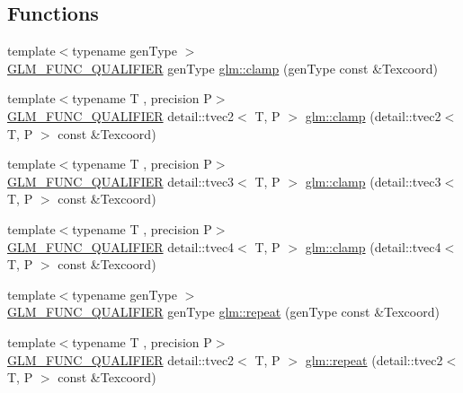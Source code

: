 \subsection*{Functions}
\begin{DoxyCompactItemize}
\item 
{\footnotesize template$<$typename gen\+Type $>$ }\\\hyperlink{setup_8hpp_a33fdea6f91c5f834105f7415e2a64407}{G\+L\+M\+\_\+\+F\+U\+N\+C\+\_\+\+Q\+U\+A\+L\+I\+F\+I\+ER} gen\+Type \hyperlink{group__gtx__wrap_ga6c0cc6bd1d67ea1008d2592e998bad33}{glm\+::clamp} (gen\+Type const \&Texcoord)
\item 
{\footnotesize template$<$typename T , precision P$>$ }\\\hyperlink{setup_8hpp_a33fdea6f91c5f834105f7415e2a64407}{G\+L\+M\+\_\+\+F\+U\+N\+C\+\_\+\+Q\+U\+A\+L\+I\+F\+I\+ER} detail\+::tvec2$<$ T, P $>$ \hyperlink{namespaceglm_ac07453cc5dd0ddf29280decfd676e7a1}{glm\+::clamp} (detail\+::tvec2$<$ T, P $>$ const \&Texcoord)
\item 
{\footnotesize template$<$typename T , precision P$>$ }\\\hyperlink{setup_8hpp_a33fdea6f91c5f834105f7415e2a64407}{G\+L\+M\+\_\+\+F\+U\+N\+C\+\_\+\+Q\+U\+A\+L\+I\+F\+I\+ER} detail\+::tvec3$<$ T, P $>$ \hyperlink{namespaceglm_a378e165eb674a1767e7532381503c45a}{glm\+::clamp} (detail\+::tvec3$<$ T, P $>$ const \&Texcoord)
\item 
{\footnotesize template$<$typename T , precision P$>$ }\\\hyperlink{setup_8hpp_a33fdea6f91c5f834105f7415e2a64407}{G\+L\+M\+\_\+\+F\+U\+N\+C\+\_\+\+Q\+U\+A\+L\+I\+F\+I\+ER} detail\+::tvec4$<$ T, P $>$ \hyperlink{namespaceglm_a7939dfce34455127dfbd4db97129b19c}{glm\+::clamp} (detail\+::tvec4$<$ T, P $>$ const \&Texcoord)
\item 
{\footnotesize template$<$typename gen\+Type $>$ }\\\hyperlink{setup_8hpp_a33fdea6f91c5f834105f7415e2a64407}{G\+L\+M\+\_\+\+F\+U\+N\+C\+\_\+\+Q\+U\+A\+L\+I\+F\+I\+ER} gen\+Type \hyperlink{group__gtx__wrap_ga809650c6310ea7c42666e918c117fb6f}{glm\+::repeat} (gen\+Type const \&Texcoord)
\item 
{\footnotesize template$<$typename T , precision P$>$ }\\\hyperlink{setup_8hpp_a33fdea6f91c5f834105f7415e2a64407}{G\+L\+M\+\_\+\+F\+U\+N\+C\+\_\+\+Q\+U\+A\+L\+I\+F\+I\+ER} detail\+::tvec2$<$ T, P $>$ \hyperlink{namespaceglm_a7553fe126144d53b6824a71289ecd757}{glm\+::repeat} (detail\+::tvec2$<$ T, P $>$ const \&Texcoord)

\end{DoxyCompactItemize}
